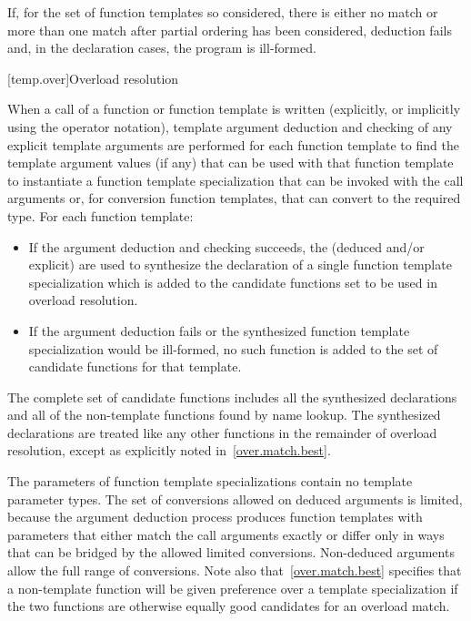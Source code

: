 \pnum
If, for the set of function templates so considered, there is either no match or
more than one match after partial ordering has been considered,
deduction fails and, in the declaration cases, the
program is ill-formed.

[temp.over]{Overload resolution}

\pnum
{}%
When a call of a function or function template
is written (explicitly, or implicitly using the
operator notation), template argument deduction
and checking of any explicit template arguments are performed
for each function template to find the template argument values (if any) that
can be used with that function template to instantiate a function template
specialization that can be invoked with the call arguments or,
for conversion function templates, that can convert to the required type.
For each function template:
\begin{itemize}
\item If the argument deduction and checking succeeds, the
(deduced and/or explicit)
are used to synthesize the declaration of
a single function template specialization which is
added to the candidate functions set to be used in overload resolution.
\item If the argument deduction fails or
the synthesized function template specialization would be ill-formed,
no such function is added to the set of candidate functions for that template.
\end{itemize}
The complete set of candidate functions includes all the synthesized
declarations and all of the non-template functions found by name lookup.
The synthesized declarations are
treated like any other functions in
the remainder of overload resolution, except as explicitly noted
in~\ref{over.match.best}.
\begin{footnote}
The parameters of function template
specializations contain no
template parameter types.
The set of conversions allowed on deduced arguments is limited, because the
argument deduction process produces function templates with parameters that
either match the call arguments exactly or differ only in ways that can be
bridged by the allowed limited conversions.
Non-deduced arguments allow the full range of conversions.
Note also that~\ref{over.match.best} specifies that a non-template function will
be given preference over a template specialization if the two functions
are otherwise equally good candidates for an overload match.
\end{footnote}


